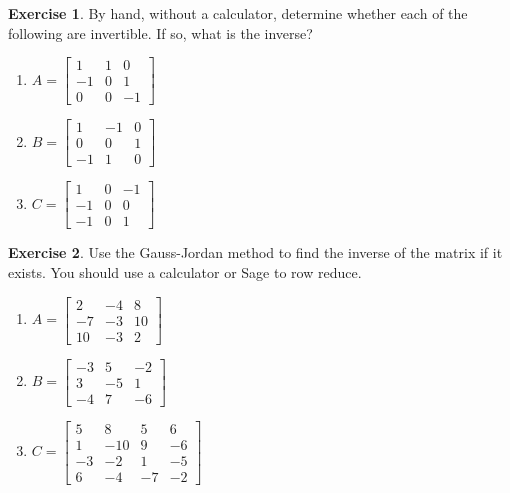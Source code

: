 \documentclass[handout]{beamer}
\newcommand{\fn}{\insertframenumber}
\theoremstyle{definition}
\newtheorem{exercise}{Exercise}
\begin{document}
\begin{frame}{\fn}
	\begin{exercise}
		By hand, without a calculator, determine whether each of the following are invertible. If so, what is the inverse?
		\begin{enumerate}[label=(\alph*)]
			\item $A=\begin{bmatrix}1 & 1 & 0 \\-1 & 0 & 1 \\0 & 0 & -1\end{bmatrix}$
			\item $B=\begin{bmatrix}1 & -1 & 0 \\0 & 0 & 1 \\-1 & 1 & 0\end{bmatrix}$
			\item $C=\begin{bmatrix}1 & 0 & -1 \\-1 & 0 & 0 \\-1 & 0 & 1\end{bmatrix}$
		\end{enumerate}
	\end{exercise}
\end{frame}
\begin{frame}{\fn}
	\begin{exercise}
		Use the Gauss-Jordan method to find the inverse of the matrix if it exists.  You should use a calculator or Sage to row reduce.
		\begin{enumerate}[label=(\alph*)]
			\item $A=\left[\begin{array}{rrr}
			2 & -4 & 8 \\
			-7 & -3 & 10 \\
			10 & -3 & 2
			\end{array}\right]$
			\item $B=
			\left[\begin{array}{rrr}
			-3 & 5 & -2 \\
			3 & -5 & 1 \\
			-4 & 7 & -6
			\end{array}\right]$
			\item $C=\left[\begin{array}{rrrr}
			5 & 8 & 5 & 6 \\
			1 & -10 & 9 & -6 \\
			-3 & -2 & 1 & -5 \\
			6 & -4 & -7 & -2
			\end{array}\right]$
		\end{enumerate}	
	\end{exercise}
\end{frame}
\end{document}
